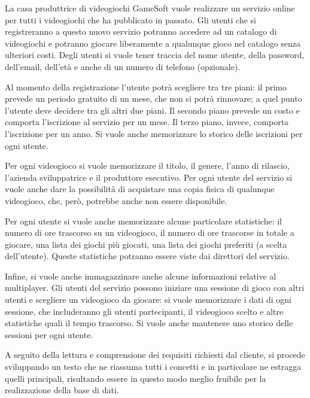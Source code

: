 \documentclass[a4paper,12pt]{report}
\begin{document}
\begin{addmargin}[4em]{4em}
La casa produttrice di videogiochi GameSoft vuole realizzare un servizio online per tutti i videogiochi che ha pubblicato in passato. Gli utenti che si registreranno a questo nuovo servizio potranno accedere ad un catalogo di videogiochi e potranno giocare liberamente a qualunque gioco nel catalogo senza ulteriori costi. Degli utenti si vuole tener traccia del nome utente, della password, dell'email, dell'età e anche di un numero di telefono (opzionale).

Al momento della registrazione l'utente potrà scegliere tra tre piani: il primo prevede un periodo gratuito di un mese, che non si potrà rinnovare; a quel punto l'utente deve decidere tra gli altri due piani. Il secondo piano prevede un costo e comporta l'iscrizione al servizio per un mese. Il terzo piano, invece, comporta l'iscrizione per un anno. Si vuole anche memorizzare lo storico delle iscrizioni per ogni utente.

Per ogni videogioco si vuole memorizzare il titolo, il genere, l'anno di rilascio, l'azienda sviluppatrice e il produttore esecutivo. Per ogni utente del servizio si vuole anche dare la possibilità di acquistare una copia fisica di qualunque videogioco, che, però, potrebbe anche non essere disponibile.

Per ogni utente si vuole anche memorizzare alcune particolare statistiche: il numero di ore trascorso su un videogioco, il numero di ore trascorse in totale a giocare, una lista dei giochi più giocati, una lista dei giochi preferiti (a scelta dell'utente). Queste statistiche potranno essere viste dai direttori del servizio.

Infine, si vuole anche immagazzinare anche alcune informazioni relative al multiplayer. Gli utenti del servizio possono iniziare una sessione di gioco con altri utenti e scegliere un videogioco da giocare: si vuole memorizzare i dati di ogni sessione, che includeranno gli utenti partecipanti, il videogioco scelto e altre statistiche quali il tempo trascorso. Si vuole anche mantenere uno storico delle sessioni per ogni utente.

\end{addmargin}

A seguito della lettura e comprensione dei requisiti richiesti dal cliente, si procede sviluppando un testo che
ne riassuma tutti i concetti e in particolare ne estragga quelli principali, risultando essere in questo modo
meglio fruibile per la realizzazione della base di dati.
\end{document}
